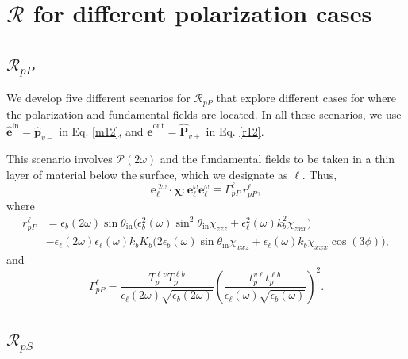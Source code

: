 
\section{\texorpdfstring{$\mathcal{R}$}{R} for different polarization cases}

\subsection{\texorpdfstring{$\mathcal{R}_{pP}$}{RpP}}

We develop five different scenarios for $\mathcal{R}_{pP}$ that explore
different cases for where the polarization and fundamental fields are located.
In all these scenarios, we use
$\hat{\mathbf{e}}^{\mathrm{in}}=\hat{\mathbf{p}}_{v-}$ in Eq. \eqref{m12}, and
$\hat{\mathbf{e}}^{\mathrm{out}}=\hat{\mathbf{P}}_{v+}$ in Eq.
\eqref{r12}.

This scenario involves $\mathcal{P}(2\omega)$ and the fundamental fields to be
taken in a thin layer of material below the surface, which we designate as
$\ell$. Thus,
\begin{equation*}\label{m80}
\mathbf{e}^{\,2\omega}_{\ell}\cdot\boldsymbol{\chi}:
\mathbf{e}^\omega_{\ell}\mathbf{e}^\omega_{\ell}
\equiv\Gamma^{\ell}_{pP}\,r^{\ell}_{pP}
,
\end{equation*}
where
\begin{align}\label{m81}
r^{\ell}_{pP} &=
\epsilon_{b}(2\omega)\sin\theta_{\mathrm{in}}
\Big(
  \epsilon^2_{b}(\omega)\sin^2\theta_{\mathrm{in}}\chi_{zzz}
+ \epsilon^2_{\ell}(\omega)k^2_{b}\chi_{zxx}
\Big)\\
&- \epsilon_{\ell}(2\omega)\epsilon_{\ell}(\omega)k_{b}K_{b}
\Big(
  2\epsilon_{b}(\omega)\sin\theta_{\mathrm{in}}\chi_{xxz}
+ \epsilon_{\ell}(\omega)k_{b}\chi_{xxx}\cos(3\phi) 
\Big),\nonumber
\end{align}
and  
\begin{equation}\label{m79}
\Gamma^{\ell}_{pP}=
\frac{T_{p}^{\ell v}T^{\ell b}_{p}}
     {\epsilon_{\ell}(2\omega)\sqrt{\epsilon_{b}(2\omega)}}
\left(
\frac{t_{p}^{v\ell}t^{\ell b}_{p}}
     {\epsilon_{\ell}(\omega)\sqrt{\epsilon_{b}(\omega)}}
\right)^{2} 
.  
\end{equation}


\subsection{\texorpdfstring{$\mathcal{R}_{pS}$}{RpS}}

